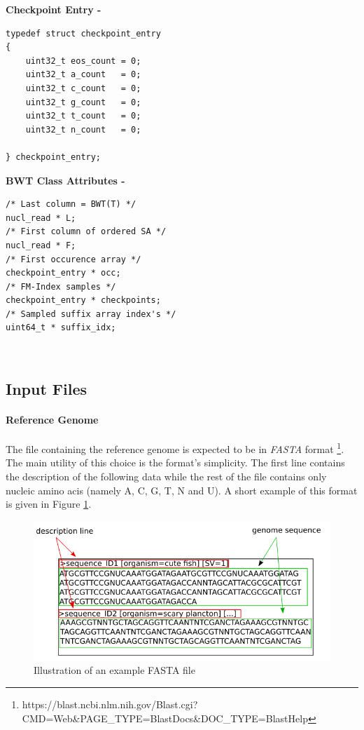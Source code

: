 \begin{minipage}[t]{0.4\textwidth}
	\textbf{Checkpoint Entry -} \\
	\vspace{-5mm}
	\begin{verbatim}   
typedef struct checkpoint_entry
{
    uint32_t eos_count = 0;
    uint32_t a_count   = 0;
    uint32_t c_count   = 0;
    uint32_t g_count   = 0;
    uint32_t t_count   = 0;
    uint32_t n_count   = 0;
	
} checkpoint_entry;
	\end{verbatim}
\end{minipage}
\hspace*{15mm}
\begin{minipage}[t]{0.5\textwidth}
		\textbf{BWT Class Attributes - }
\begin{verbatim}
/* Last column = BWT(T) */
nucl_read * L;
/* First column of ordered SA */
nucl_read * F;	
/* First occurence array */
checkpoint_entry * occ;	
/* FM-Index samples */
checkpoint_entry * checkpoints; 
/* Sampled suffix array index's */
uint64_t * suffix_idx;	

	\end{verbatim}
	\textcolor{white}{.}\\

	
	
\end{minipage}

\subsection{Input Files}

\paragraph{Reference Genome}
The file containing the reference genome is expected to be in \textsl{FASTA} format \footnote{https://blast.ncbi.nlm.nih.gov/Blast.cgi?CMD=Web&PAGE_TYPE=BlastDocs&DOC_TYPE=BlastHelp}. The main utility of this choice is the format's simplicity. The first line contains the description of the following data while the rest of the file contains only nucleic amino acis (namely A, C, G, T, N and U). A short example of this format is given in Figure \ref{fig:fasta}.

\begin{figure}[H]
    \centering
    \includegraphics[scale = 0.5]{Figures/fastaex.png}
    \caption{Illustration of an example FASTA file }
    \label{fig:fasta}
\end{figure}

